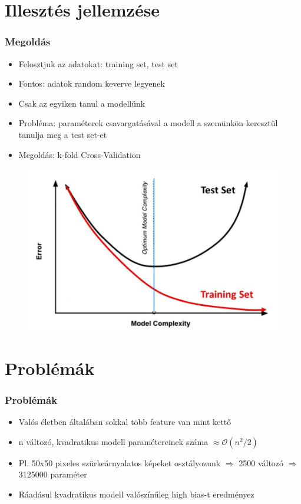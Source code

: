\documentclass{beamer}
\begin{document}
\section{Illesztés jellemzése}
\begin{frame}
\frametitle{Megoldás}
\begin{minipage}{0.48\textwidth}

\begin{itemize}
  \setlength{\itemsep}{6pt}
\item Felosztjuk az adatokat: training set, test set
\item Fontos: adatok random keverve legyenek
\item Csak az egyiken tanul a modellünk
\item Probléma: paraméterek csavargatásával a modell a szemünkön keresztül tanulja meg a test set-et
\item Megoldás: k-fold Cross-Validation
\end{itemize}
\end{minipage}
\begin{minipage}{0.48\textwidth}

\begin{figure}[H]
	\centering
    		\includegraphics[width=\textwidth]{pic/nn/6}
\end{figure}
\end{minipage}
\end{frame}

\section{Problémák}
\begin{frame}
\frametitle{Problémák}
\begin{itemize}
  \setlength{\itemsep}{12pt}
\item Valós életben általában sokkal több feature van mint kettő
\item n változó, kvadratikus modell paramétereinek száma $\approx \mathcal{O}(n^2/2)$
\item Pl. 50x50 pixeles szürkeárnyalatos képeket osztályozunk $\Rightarrow$ 2500 változó $\Rightarrow$ 3125000 paraméter
\item Ráadásul kvadratikus modell valószínűleg high bias-t eredményez
\end{itemize}
\end{frame}
\end{document}

